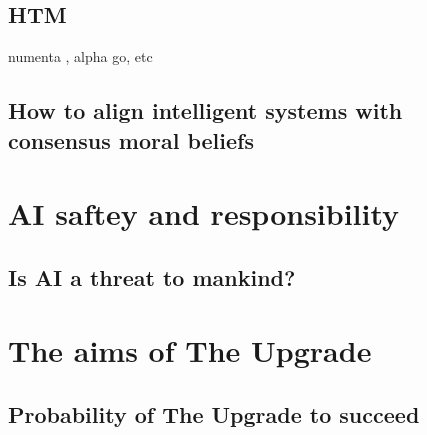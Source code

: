 \subsection{HTM}
numenta \cite{numentahome}, alpha go, etc
\subsection{How to align intelligent systems with consensus moral beliefs}

\section{AI saftey and responsibility}
\subsection{Is AI a threat to mankind?}
\subsection{}

\section{The aims of The Upgrade}

\subsection{Probability of The Upgrade to succeed}
